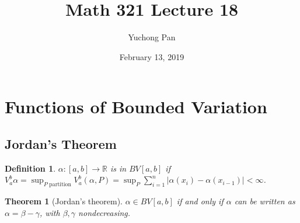 \documentclass[letterpaper, reqno,11pt]{article}
\newcommand{\RR}{\mathbb{R}}
\begin{document}
\title{Math 321 Lecture 18}
\author{Yuchong Pan}
\date{February 13, 2019}
\newtheorem{thm}{Theorem}
\newtheorem{defn}{Definition}
\newtheorem*{remark}{Remark}
\newtheorem{claim}{Claim}
\newtheorem{cor}{Corollary}
\newtheorem{lemma}{Lemma}
\newtheorem{prop}{Proposition}
\maketitle
%

\section{Functions of Bounded Variation}

\subsection{Jordan's Theorem}

\begin{defn}
  \normalfont $\alpha : [a, b] \to \RR$ is in $BV[a, b]$ if $V_a^b \alpha = \sup_\text{$P$ partition} V_a^b (\alpha, P) = \sup_P \sum_{i = 1}^n |\alpha(x_i) - \alpha(x_{i - 1})| < \infty$.
\end{defn}

\begin{thm}[Jordan's theorem]
  \normalfont $\alpha \in BV[a, b]$ if and only if $\alpha$ can be written as $\alpha = \beta - \gamma$, with $\beta, \gamma$ nondecreasing.
\end{thm}
\end{document}

